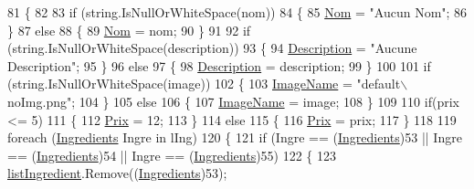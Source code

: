 \begin{DoxyCode}
81         \{
82 
83             \textcolor{keywordflow}{if} (\textcolor{keywordtype}{string}.IsNullOrWhiteSpace(nom))
84             \{
85                 \hyperlink{classModele_1_1Pizza_acd4ac908946cc662e4d4dc6e77b302d1}{Nom} = \textcolor{stringliteral}{"Aucun Nom"};
86             \}
87             \textcolor{keywordflow}{else}
88             \{
89                 \hyperlink{classModele_1_1Pizza_acd4ac908946cc662e4d4dc6e77b302d1}{Nom} = nom;
90             \}
91 
92             \textcolor{keywordflow}{if} (\textcolor{keywordtype}{string}.IsNullOrWhiteSpace(description))
93             \{
94                 \hyperlink{classModele_1_1Pizza_a5e6e4375e83eebb37581adcbebf9b045}{Description} = \textcolor{stringliteral}{"Aucune Description"};
95             \}
96             \textcolor{keywordflow}{else}
97             \{
98                 \hyperlink{classModele_1_1Pizza_a5e6e4375e83eebb37581adcbebf9b045}{Description} = description;
99             \}
100 
101             \textcolor{keywordflow}{if} (\textcolor{keywordtype}{string}.IsNullOrWhiteSpace(image))
102             \{
103                 \hyperlink{classModele_1_1Pizza_ababa571729fe09ebe01cf875451999ea}{ImageName} = \textcolor{stringliteral}{"default\(\backslash\)noImg.png"};
104             \}
105             \textcolor{keywordflow}{else}
106             \{
107                 \hyperlink{classModele_1_1Pizza_ababa571729fe09ebe01cf875451999ea}{ImageName} = image;
108             \}
109 
110             \textcolor{keywordflow}{if}(prix <= 5)
111             \{
112                 \hyperlink{classModele_1_1Pizza_a8a8c0efc22d46be85489d220228733ca}{Prix} = 12;
113             \}
114             \textcolor{keywordflow}{else}
115             \{
116                 \hyperlink{classModele_1_1Pizza_a8a8c0efc22d46be85489d220228733ca}{Prix} = prix;
117             \}
118 
119             \textcolor{keywordflow}{foreach} (\hyperlink{namespaceModele_a001a8e89e56a724f24a249ba98080d41}{Ingredients} Ingre \textcolor{keywordflow}{in} lIng)
120             \{
121                 \textcolor{keywordflow}{if} (Ingre == (\hyperlink{namespaceModele_a001a8e89e56a724f24a249ba98080d41}{Ingredients})53 || Ingre == (\hyperlink{namespaceModele_a001a8e89e56a724f24a249ba98080d41}{Ingredients})54 || Ingre == 
      (\hyperlink{namespaceModele_a001a8e89e56a724f24a249ba98080d41}{Ingredients})55)
122                 \{
123                     \hyperlink{classModele_1_1Pizza_ae05b1d6e08e5f801e3902c9c572a530b}{listIngredient}.Remove((\hyperlink{namespaceModele_a001a8e89e56a724f24a249ba98080d41}{Ingredients})53);

\end{DoxyCode}

